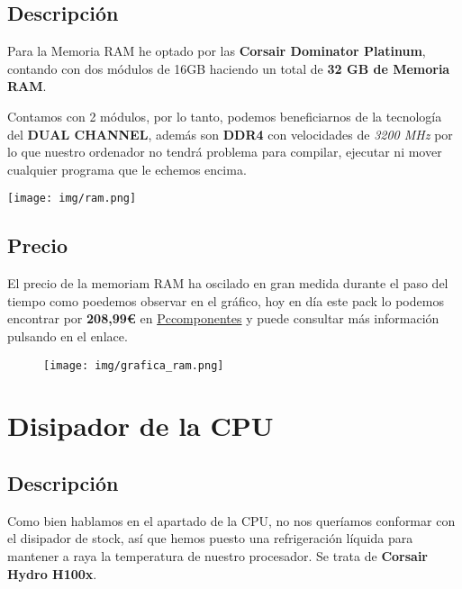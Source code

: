 \documentclass{article}
\begin{document}
      \subsection{Descripción}
        Para la Memoria RAM he optado por las \textbf{Corsair Dominator Platinum}, contando con dos módulos de 16GB haciendo un total de \textbf{32 GB de Memoria RAM}.
        \\
        \begin{minipage}{0.5\textwidth}
        Contamos con 2 módulos, por lo tanto, podemos beneficiarnos de la tecnología del \textbf{DUAL CHANNEL}, además son \textbf{DDR4} con velocidades de \textit{3200 MHz} por lo que nuestro ordenador no tendrá problema para compilar, ejecutar ni mover 
        cualquier programa que le echemos encima.
        \end{minipage}
        \begin{minipage}{\textwidth}
          \texttt{[image: img/ram.png]}
        \end{minipage}
      \subsection{Precio}
        El precio de la memoriam RAM ha oscilado en gran medida durante el paso del tiempo como poedemos observar en el gráfico, hoy en día este pack lo podemos encontrar por \textbf{208,99€} en 
        \href{https://www.pccomponentes.com/corsair-dominator-platinum-rgb-ddr4-3200-pc4-25600-32gb-2x16gb-cl16}{Pccomponentes} y puede consultar más información pulsando en el enlace.
        \\
        \begin{figure}[h]
          \centering
          \texttt{[image: img/grafica\_ram.png]}
        \end{figure}

  \newpage
    \section{Disipador de la CPU}
      \subsection{Descripción}
        Como bien hablamos en el apartado de la CPU, no nos queríamos conformar con el disipador de stock, así que hemos puesto una refrigeración líquida para mantener a raya la temperatura de nuestro procesador. Se trata de 
        \textbf{Corsair Hydro H100x}.
        
\end{document}
